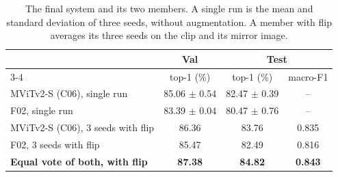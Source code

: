 \begin{table}[ht]
\centering
\caption{The final system and its two members. A single run is the mean and
standard deviation of three seeds, without augmentation. A member with flip
averages its three seeds on the clip and its mirror image.}
\label{tab:final_system}
\begin{tabular}{@{}lccc@{}}
\toprule
 & Val & \multicolumn{2}{c}{Test} \\
\cmidrule(l){3-4}
 & top-1 (\%) & top-1 (\%) & macro-F1 \\
\midrule
MViTv2-S (C06), single run & 85.06 $\pm$ 0.54 & 82.47 $\pm$ 0.39 & -- \\
F02, single run            & 83.39 $\pm$ 0.04 & 80.47 $\pm$ 0.76 & -- \\
\addlinespace
MViTv2-S (C06), 3 seeds with flip & 86.36 & 83.76 & 0.835 \\
F02, 3 seeds with flip            & 85.47 & 82.49 & 0.816 \\
\addlinespace
\textbf{Equal vote of both, with flip} & \textbf{87.38} & \textbf{84.82} & \textbf{0.843} \\
\bottomrule
\end{tabular}
\end{table}
